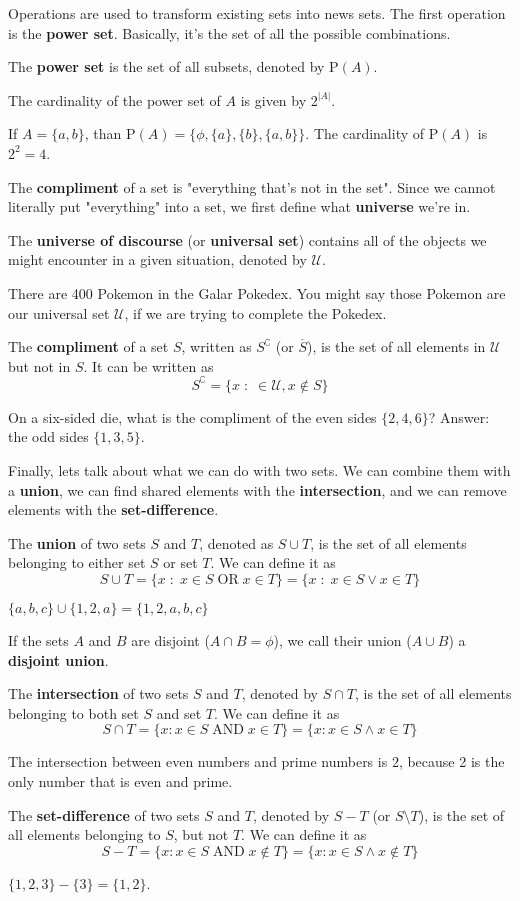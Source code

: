Operations are used to transform existing sets into news sets.  The first operation is the {\bf power set}. Basically, it's the set of all the possible combinations.

\mydefine
{
	The {\bf power set} is the set of all subsets, denoted by $\text{P}(A)$.
}

\myproposition
{
	The cardinality of the power set of $A$ is given by $2^{|A|}$.
}

\myexample
{
	If $A=\{a,b\}$, than $\text{P}(A) = \{\phi,\{a\},\{b\},\{a,b\}\}$. The cardinality of $\text{P}(A)$ is $2^{2}=4$.
}

The {\bf compliment} of a set is "everything that's not in the set". Since we cannot literally put "everything" into a set, we first define what {\bf universe} we're in. 

\mydefine
{
	The {\bf universe of discourse} (or {\bf universal set}) contains all of the objects we might encounter in a given situation, denoted by $\mathcal{U}$.
}

\myexample
{
	There are 400 Pokemon in the Galar Pokedex. You might say those Pokemon are our universal set $\mathcal{U}$, if we are trying to complete the Pokedex.
}

\mydefine
{
	The {\bf compliment} of a set $S$, written as $S^\complement$ (or $\overline{S}$), is the set of all elements in $\mathcal{U}$ but not in $S$. It can be written as
	\[
		S^\complement = \{x \;:\; \in \mathcal{U}, x \notin S\}
	\]
}

\myexample
{
	On a six-sided die, what is the compliment of the even sides $\{2,4,6\}$? Answer: the odd sides $\{1,3,5\}$.
}

Finally, lets talk about what we can do with two sets. We can combine them with a {\bf union}, we can find shared elements with the {\bf intersection}, and we can remove elements with the {\bf set-difference}.

\mydefine
{
	The {\bf union} of two sets $S$ and $T$, denoted as $S \cup T$, is the set of all elements belonging to either set $S$ or set $T$. We can define it as
	\[
		S \cup T = \{x \;:\; x \in S \;\text{OR}\; x \in T \} = \{x \;:\; x \in S \vee x \in T \}
	\]
}

\myexample
{
	$\{a,b,c\} \cup \{1,2,a\} = \{1,2,a,b,c\}$
}

If the sets $A$ and $B$ are disjoint ($A \cap B = \phi$), we call their union ($A \cup B$) a {\bf disjoint union}.

\mydefine
{
	The {\bf intersection} of two sets $S$ and $T$, denoted by $S\cap T$, is the set of all elements belonging to both set $S$ and set $T$. We can define it as
	\[
		S \cap T = \{ x : x \in S \;\text{AND}\; x \in T\} = \{ x : x \in S \wedge x \in T\}
	\]
}

\myexample
{
	The intersection between even numbers and prime numbers is ${2}$, because 2 is the only number that is even and prime.
}

\mydefine
{
	The {\bf set-difference} of two sets $S$ and $T$, denoted by $S-T$ (or $S \setminus T$), is the set of all elements belonging to $S$, but not $T$. We can define it as
	\[
		S-T = \{x : x \in S \;\text{AND}\; x \notin T\} = \{x : x \in S \wedge x \notin T\}
	\]
}

\myexample
{
	$\{1,2,3\} - \{3\} = \{1,2\}$.
}
